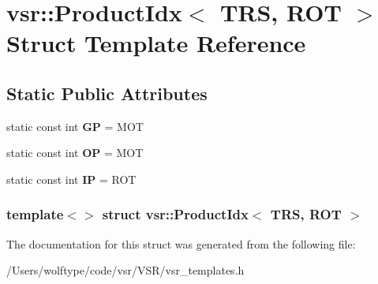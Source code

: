 \hypertarget{structvsr_1_1_product_idx_3_01_t_r_s_00_01_r_o_t_01_4}{\section{vsr\-:\-:Product\-Idx$<$ T\-R\-S, R\-O\-T $>$ Struct Template Reference}
\label{structvsr_1_1_product_idx_3_01_t_r_s_00_01_r_o_t_01_4}
}
\subsection*{Static Public Attributes}
\begin{DoxyCompactItemize}
\item 
\hypertarget{structvsr_1_1_product_idx_3_01_t_r_s_00_01_r_o_t_01_4_af39713056844f73c49d6dc78495af5f0}{static const int {\bfseries G\-P} = M\-O\-T}\label{structvsr_1_1_product_idx_3_01_t_r_s_00_01_r_o_t_01_4_af39713056844f73c49d6dc78495af5f0}

\item 
\hypertarget{structvsr_1_1_product_idx_3_01_t_r_s_00_01_r_o_t_01_4_a3ff39cfd6c042fbdfe1816eb99e40163}{static const int {\bfseries O\-P} = M\-O\-T}\label{structvsr_1_1_product_idx_3_01_t_r_s_00_01_r_o_t_01_4_a3ff39cfd6c042fbdfe1816eb99e40163}

\item 
\hypertarget{structvsr_1_1_product_idx_3_01_t_r_s_00_01_r_o_t_01_4_a604f994c7fc5afb4cf26520b5a690d7f}{static const int {\bfseries I\-P} = R\-O\-T}\label{structvsr_1_1_product_idx_3_01_t_r_s_00_01_r_o_t_01_4_a604f994c7fc5afb4cf26520b5a690d7f}

\end{DoxyCompactItemize}
\subsubsection*{template$<$$>$ struct vsr\-::\-Product\-Idx$<$ T\-R\-S, R\-O\-T $>$}



The documentation for this struct was generated from the following file\-:\begin{DoxyCompactItemize}
\item 
/\-Users/wolftype/code/vsr/\-V\-S\-R/vsr\-\_\-templates.\-h\end{DoxyCompactItemize}
